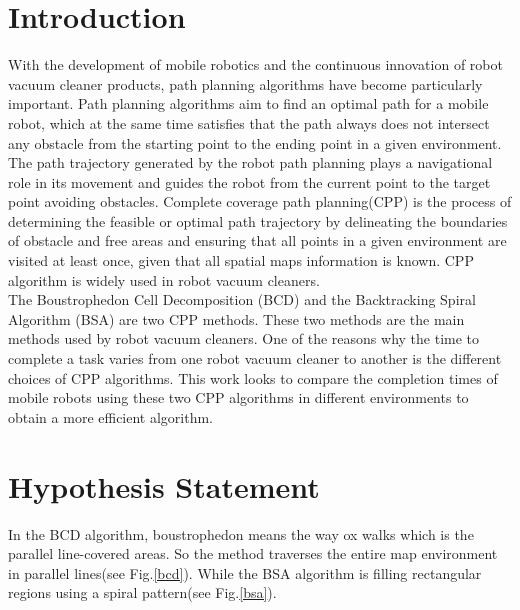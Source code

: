 \documentclass[conference]{IEEEtran}
\begin{document}
\section{Introduction}
\label{Sec1}
With the development of mobile robotics and the continuous innovation of robot vacuum cleaner products, path planning algorithms have become particularly important. Path planning algorithms aim to find an optimal path for a mobile robot, which at the same time satisfies that the path always does not intersect any obstacle from the starting point to the ending point in a given environment. The path trajectory generated by the robot path planning plays a navigational role in its movement and guides the robot from the current point to the target point avoiding obstacles. Complete coverage path planning(CPP) is the process of determining the feasible or optimal path trajectory by delineating the boundaries of obstacle and free areas and ensuring that all points in a given environment are visited at least once, given that all spatial maps information is known. CPP algorithm is widely used in robot vacuum cleaners\cite{colegrave1994case}.\\
The Boustrophedon Cell Decomposition (BCD)\cite{lavalle2006planning} and the Backtracking Spiral Algorithm (BSA)\cite{gonzalez2005bsa} are two CPP methods. These two methods are the main methods used by robot vacuum cleaners. One of the reasons why the time to complete a task varies from one robot vacuum cleaner to another is the different choices of CPP algorithms. This work looks to compare the completion times of mobile robots using these two CPP algorithms in different environments to obtain a more efficient algorithm.

\section{Hypothesis Statement}
In the BCD algorithm, boustrophedon\cite{choset1998coverage} means the way ox walks which is the parallel line-covered areas. So the method traverses the entire map environment in parallel lines(see Fig.\ref{bcd}). While the BSA algorithm\cite{Gonzlez2003BSAAC} is filling rectangular regions using a spiral pattern(see Fig.\ref{bsa}).\\
\end{document}
